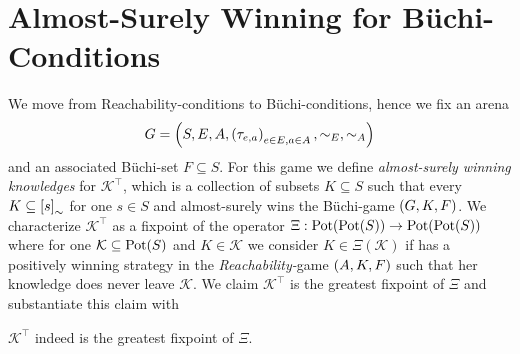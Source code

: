 \section{Almost-Surely Winning for Büchi-Conditions}
We move from Reachability-conditions to Büchi-conditions, hence we fix an arena
\begin{equation*}
  G = \left(S, E, A, \left(\tau_{e,a}\right)_{e\in E,a\in A}, \sim_{E}, \sim_{A}\right)
\end{equation*}
and an associated Büchi-set $F\subseteq S$. For this game we define 
\emph{almost-surely winning knowledges} for \eve{} $\mathcal{K}^{\top}$, which
is a collection of subsets $K\subseteq S$ such that every 
$K\subseteq\left[s\right]_{\sim}$ for one $s\in S$ and \eve{} almost-surely wins
the Büchi-game $\left(G, K, F\right)$. We characterize $\mathcal{K}^{\top}$ as a
fixpoint of the operator $\Xi:\operatorname{Pot}(\operatorname{Pot}(S))\rightarrow\operatorname{Pot}(\operatorname{Pot}(S))$ where for
one $\mathcal{K}\subseteq\operatorname{Pot}(S)$ and $K\in\mathcal{K}$ we consider 
$K\in\Xi(\mathcal{K})$ if \eve{} has a positively winning strategy in the
\emph{Reachability-}game $\left(A, K, F\right)$ such that her knowledge does never
leave $\mathcal{K}$. We claim $\mathcal{K}^{\top}$ is the greatest fixpoint of
$\Xi$ and substantiate this claim with
\begin{lemma}
  $\mathcal{K}^{\top}$ indeed is the greatest fixpoint of $\Xi$.
\end{lemma}
